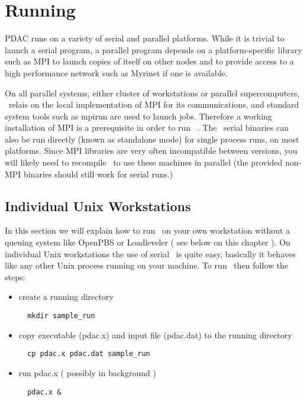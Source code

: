 \section{Running \PDAC}
\label{section:run}

PDAC runs on a variety of serial and parallel platforms.  While it is
trivial to launch a serial program, a parallel program depends on a
platform-specific library such as MPI to launch copies of itself on
other nodes and to provide access to a high performance network such
as Myrinet if one is available.

On all parallel systems, either cluster of workstations or 
parallel supercomputers, \PDAC\ relais on the local implementation
of MPI for its communications, and standard system tools such as
mpirun are used to launch jobs. Therefore a working installation
of MPI is a prerequisite in order to run \PDAC\ .
The \PDAC\ serial binaries can also be
run directly (known as standalone mode) for single process runs,
on most platforms.
Since MPI libraries are very often
incompatible between versions, you will likely need to recompile \PDAC\
to use these machines in parallel
(the provided non-MPI binaries should still work for serial runs.)

\subsection{Individual Unix Workstations}

In this section we will explain how to run \PDAC\ on your own
workstation without a queuing system like
OpenPBS or Loadleveler ( see below on this chapter ).
On individual Unix workstations the use of serial \PDAC\ is
quite easy, basically it behaves like any other Unix process
running on your machine.
To run \PDAC\ then follow the steps:

\begin{itemize}

\item create a running directory\
\begin{verbatim}
  mkdir sample_run
\end{verbatim}

\item copy executable (pdac.x) and input file (pdac.dat)
      to the running directory\
\begin{verbatim}
  cp pdac.x pdac.dat sample_run
\end{verbatim}

\item run pdac.x ( possibly in background )
\begin{verbatim}
  pdac.x &
\end{verbatim}

\end{itemize}

